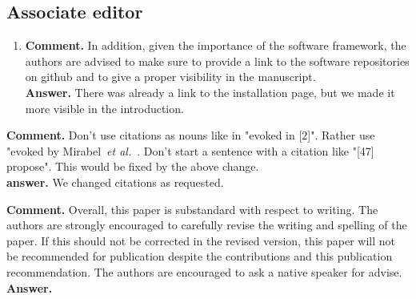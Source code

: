 \documentclass{article}
\begin{document}
\subsection*{Associate editor}
\begin{enumerate}
\item \textbf{Comment.} In addition, given the importance of the
  software framework, the authors are advised to make sure to provide
  a link to the software repositories on github and to give a proper
  visibility in the manuscript.\\ \textbf{Answer.} There was already a link
  to the installation page, but we made it more visible in the introduction.
\end{enumerate}

\item \textbf{Comment.} Don't use citations as nouns like in "evoked
  in [2]". Rather use "evoked by Mirabel~\emph{et al.}~\cite{...}.
  Don't start a sentence with a citation like "[47] propose". This
  would be fixed by the above change.\\
  \textbf{answer.} We changed citations as requested.

\item \textbf{Comment.} 
Overall, this paper is substandard with respect to writing. The authors
are strongly encouraged to carefully revise the writing and spelling of
the paper. If this should not be corrected in the revised version, this
paper will not be recommended for publication despite the contributions
and this publication recommendation. The authors are encouraged to ask
a native speaker for advise.\\ \textbf{Answer.}
\end{document}

